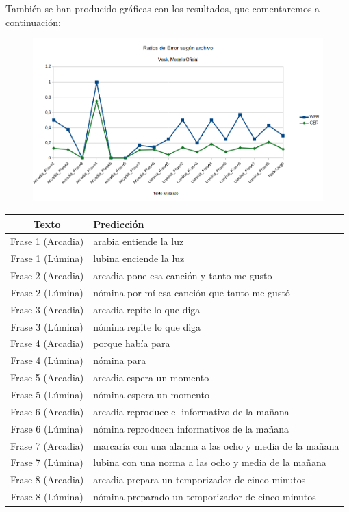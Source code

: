 También se han producido gráficas con los resultados, que comentaremos a continuación:

\begin{figure}[H]
	\includegraphics[width=\textwidth]{imagenes/WERCER_VoskIvan.png}
\end{figure}

\begin{table}
\begin{tabularx}{\textwidth}{|c|X|}
	\hline
	Texto & Predicción \\ \hline
	 Frase 1 (Arcadia) & arabia entiende la luz \\ \hline
	 Frase 1 (Lúmina) & lubina enciende la luz  \\ \hline
	 Frase 2 (Arcadia)& arcadia pone esa canción y tanto me gusto \\ \hline
	 Frase 2 (Lúmina)& nómina por mí esa canción que tanto me gustó \\ \hline
	 Frase 3 (Arcadia)& arcadia repite lo que diga \\ \hline
	 Frase 3 (Lúmina)& nómina repite lo que diga \\ \hline
	 Frase 4 (Arcadia)& porque había para \\ \hline
	 Frase 4 (Lúmina)& nómina para \\ \hline
	 Frase 5 (Arcadia)& arcadia espera un momento \\ \hline
	 Frase 5 (Lúmina)& nómina espera un momento \\ \hline
	 Frase 6 (Arcadia)& arcadia reproduce el informativo de la mañana \\ \hline
	 Frase 6 (Lúmina)& nómina reproducen informativos de la mañana \\ \hline
	 Frase 7 (Arcadia)& marcaría con una alarma a las ocho y media de la mañana \\ \hline
	 Frase 7 (Lúmina)& lubina con una norma a las ocho y media de la mañana \\ \hline
	 Frase 8 (Arcadia)& arcadia prepara un temporizador de cinco minutos \\ \hline
	 Frase 8 (Lúmina)& nómina preparado un temporizador de cinco minutos \\ \hline

\end{tabularx}
\end{table}


